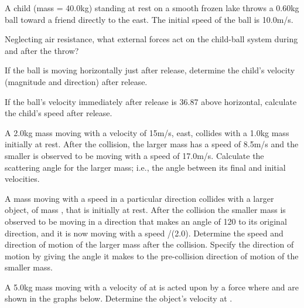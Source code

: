 {{\begin{two-digit-list}
\item [9.] A child (mass = 40.0\unit{kg}) standing at rest on a smooth frozen lake
           throws a 0.60\unit{kg} ball toward a friend directly to the east.
           The initial speed of the ball is 10.0\unit{m/s}.
\begin{one-digit-list}
\item [a.] Neglecting air resistance, what external forces act on the
           child-ball system during and after the throw?
\item [b.] If the ball is moving horizontally just after release, determine the
           child's velocity (magnitude and direction) after release.
\item [c.] If the ball's velocity immediately after release is {36.87\degrees}
           above horizontal, calculate the child's speed after release. 
\end{one-digit-list}

\item [10.] A 2.0\unit{kg} mass moving with a velocity of 15\unit{m/s}, east,
            collides with a 1.0\unit{kg} mass initially at rest.
            After the collision, the larger mass has a speed of 8.5\unit{m/s} and
            the smaller is observed to be moving with a speed of 17.0\unit{m/s}.
            Calculate the scattering angle for the larger mass; i.e., the angle between
            its final and initial velocities.  

\item [11.] A mass  moving with a speed  in a particular direction collides with
            a larger object, of mass , that is initially at rest.
            After the collision the smaller mass is observed to be moving in a direction that
            makes an angle of {120\degrees} to its original direction, and it is now moving
            with a speed /(2.0).
            Determine the speed and direction of motion of the larger mass after the collision.
            Specify the direction of motion by giving the angle it makes to the pre-collision direction
            of motion of the smaller mass.  

\item [12.] A 5.0\unit{kg} mass moving with a velocity of
             at  is acted upon by a
            force  where  and 
            are shown in the graphs below.
            Determine the object's velocity at . 


\end{two-digit-list}}}
